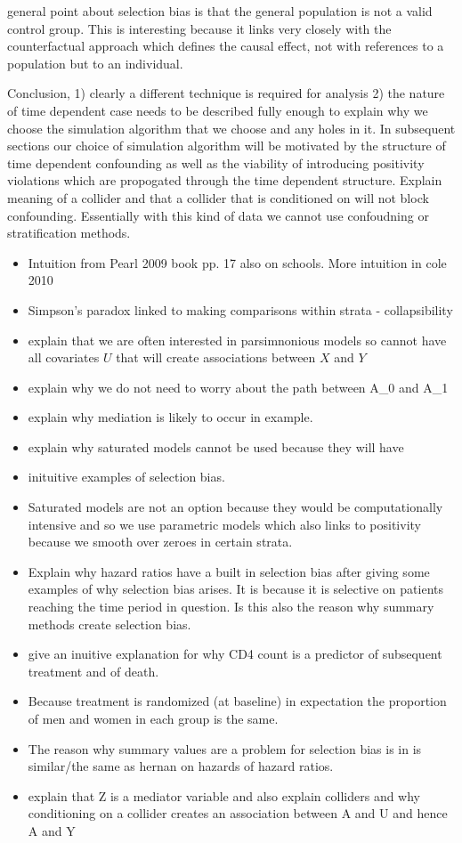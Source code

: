 \documentclass[11pt]{article}
\providecommand{\tightlist}{%
      \setlength{\itemsep}{0pt}\setlength{\parskip}{0pt}}
\begin{document}
general point about selection bias is that the general population is not
a valid control group. This is interesting because it links very closely
with the counterfactual approach which defines the causal effect, not
with references to a population but to an individual.

Conclusion, 1) clearly a different technique is required for analysis 2)
the nature of time dependent case needs to be described fully enough to
explain why we choose the simulation algorithm that we choose and any
holes in it. In subsequent sections our choice of simulation algorithm
will be motivated by the structure of time dependent confounding as well
as the viability of introducing positivity violations which are
propogated through the time dependent structure. Explain meaning of a
collider and that a collider that is conditioned on will not block
confounding. Essentially with this kind of data we cannot use
confoudning or stratification methods.

\begin{itemize}
\tightlist
\item
  Intuition from Pearl 2009 book pp. 17 also on schools. More intuition
  in cole 2010
\item
  Simpson's paradox linked to making comparisons within strata -
  collapsibility
\item
  explain that we are often interested in parsimnonious models so cannot
  have all covariates \(U\) that will create associations between \(X\)
  and \(Y\)
\item
  explain why we do not need to worry about the path between A\_0 and
  A\_1
\item
  explain why mediation is likely to occur in example.
\item
  explain why saturated models cannot be used because they will have
\item
  inituitive examples of selection bias.
\item
  Saturated models are not an option because they would be
  computationally intensive and so we use parametric models which also
  links to positivity because we smooth over zeroes in certain strata.
\item
  Explain why hazard ratios have a built in selection bias after giving
  some examples of why selection bias arises. It is because it is
  selective on patients reaching the time period in question. Is this
  also the reason why summary methods create selection bias.
\item
  give an inuitive explanation for why CD4 count is a predictor of
  subsequent treatment and of death.
\item
  Because treatment is randomized (at baseline) in expectation the
  proportion of men and women in each group is the same.
\item
  The reason why summary values are a problem for selection bias is in
  \citet{Robins1992} is similar/the same as hernan on hazards of hazard
  ratios.
\item
  explain that Z is a mediator variable and also explain colliders and
  why conditioning on a collider creates an association between A and U
  and hence A and Y
\end{itemize}
\end{document}
